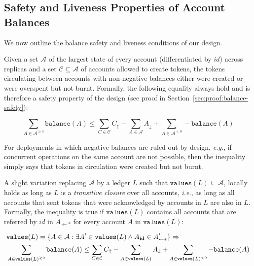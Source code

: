 \documentclass[9pt]{article}   	%
\begin{document}
\subsection{Safety and Liveness Properties of Account Balances}
\label{sec:safety-liveness}

We now outline the balance safety and liveness conditions of our design.

Given a set $\mathcal{A}$ of the largest state of every account (differentiated by $id$) across replicas and a set $\mathcal{C \subseteq \mathcal{A}}$ of accounts allowed to create tokens, the tokens circulating between accounts with non-negative balances either were created or were overspent but not burnt. Formally, the following equality always hold and is therefore a safety property of the design (see proof in Section~\ref{sec:proof:balance-safety}):

\begin{equation}
\label{eq:balance-safety}
\sum\limits_{A \in \mathcal{A}^{\geq 0}} \texttt{balance}(A) \leq  
		\sum\limits_{C \in \mathcal{C}} C_\uparrow 
		- \sum\limits_{A \in \mathcal{A}} A_\downarrow 
		+ \sum\limits_{A \in \mathcal{A}^{< 0}}  -\texttt{balance}(A)
\end{equation}

For deployments in which negative balances are ruled out by design, \textit{e.g.}, if concurrent operations on the same account are not possible, then the inequality simply says that tokens in circulation were created but not burnt.


A slight variation replacing $\mathcal{A}$ by a ledger $L$ such that $\texttt{values}(L) \subseteq \mathcal{A}$, locally holds as long as $L$ is a \textit{transitive closure} over all accounts, \textit{i.e.},  as long as all accounts that sent tokens that were acknowledged by accounts in $L$ are also in $L$. Formally, the inequality is true if $\texttt{values}(L)$ contains all accounts that are referred by $id$ in $A_{\leftarrow *}$ for every account $A$ in $\texttt{values}(L)$:

\begin{eqnarray*}
\label{eq:balance-safety-ledger}
 & \texttt{values}(L) = \{ A \in \mathcal{A} : \exists A' \in \texttt{values}(L) \wedge A_{\scriptsize \textbf{id}} \in A'_{\leftarrow *} \} 
\Rightarrow \\
& \sum\limits_{A \in \texttt{values}(L)^{\geq 0}} \texttt{balance}(A) \leq  
		\sum\limits_{C \in \mathcal{C}} C_\uparrow 
		- \sum\limits_{A \in \texttt{values}(L)} A_\downarrow 
		+ \sum\limits_{A \in \texttt{values}(L)^{< 0}}  -\texttt{balance}(A)
\end{eqnarray*}
\end{document}
